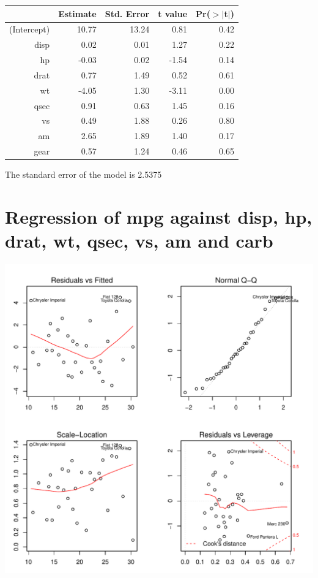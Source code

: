 \documentclass{article}\usepackage[]{graphicx}\usepackage[]{color}
\makeatletter
\def\maxwidth{ %
  \ifdim\Gin@nat@width>\linewidth
    \linewidth
  \else
    \Gin@nat@width
  \fi
}
\newenvironment{knitrout}{}{} %
\makeatother
\begin{document}
\begin{table}[ht]
\centering
\begin{tabular}{rrrrr}
  \hline
 & Estimate & Std. Error & t value & Pr($>$$|$t$|$) \\ 
  \hline
(Intercept) & 10.77 & 13.24 & 0.81 & 0.42 \\ 
  disp & 0.02 & 0.01 & 1.27 & 0.22 \\ 
  hp & -0.03 & 0.02 & -1.54 & 0.14 \\ 
  drat & 0.77 & 1.49 & 0.52 & 0.61 \\ 
  wt & -4.05 & 1.30 & -3.11 & 0.00 \\ 
  qsec & 0.91 & 0.63 & 1.45 & 0.16 \\ 
  vs & 0.49 & 1.88 & 0.26 & 0.80 \\ 
  am & 2.65 & 1.89 & 1.40 & 0.17 \\ 
  gear & 0.57 & 1.24 & 0.46 & 0.65 \\ 
   \hline
\end{tabular}
\end{table}




The standard error of the model is 2.5375

\newpage

\section{Regression of mpg against disp, hp, drat, wt, qsec, vs, am and carb }
\begin{knitrout}
\color{fgcolor}

{\centering \includegraphics[width=\maxwidth]{figure/lm-disp-hp-drat-wt-qsec-vs-am-carb} 

}



\end{knitrout}
\end{document}
